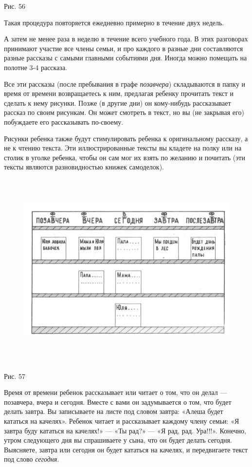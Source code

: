 \documentclass[a5paper]{book}
\renewcommand{\emph}[1]{\textit{#1}}
\begin{document}
Рис. 56

Такая процедура повторяется ежедневно примерно в течение двух недель.

А затем не менее раза в неделю в течение всего учебного года. В этих
разговорах принимают участие все члены семьи, и про каждого в разные дни
составляются разные рассказы с самыми главными событиями дня. Иногда
можно помещать на полотне 3-4 рассказа.

Все эти рассказы (после пребывания в графе \emph{позавчера})
складываются в папку и время от времени возвращаетесь к ним, предлагая
ребенку прочитать текст и сделать к нему рисунки. Позже (в другие дни)
он кому-нибудь рассказывает рассказ по своим рисункам. Он может смотреть
в текст, но вы (не закрывая его) побуждаете его рассказывать по-своему.

Рисунки ребенка также будут стимулировать ребенка к оригинальному
рассказу, а не к чтению текста. Эти иллюстрированные тексты вы кладете
на полку или на столик в уголке ребенка, чтобы он сам мог их взять по
желанию и почитать (эти тексты являются разновидностью книжек
самоделок).

\begin{figure}
\centering
\includegraphics[width=6.02917in,height=3.92799in]{media/media/image54.jpg}
\end{figure}

Рис. 57

Время от времени ребенок рассказывает или читает о том, что он делал ---
позавчера, вчера и сегодня. Вместе с вами он задумывается о том, что
будет делать завтра. Вы записываете на листе под словом завтра: «Алеша
будет кататься на качелях». Ребенок читает и рассказывает каждому члену
семьи: «Я завтра буду кататься на качелях!» --- «Ты рад?» --- «Я рад,
рад. Ура!!!». Конечно, утром следующего дня вы спрашиваете у сына, что
он будет делать сегодня. Выясняете, завтра или сегодня он будет кататься
на качелях, и передвигаете текст под слово \emph{сегодня.}
\end{document}
